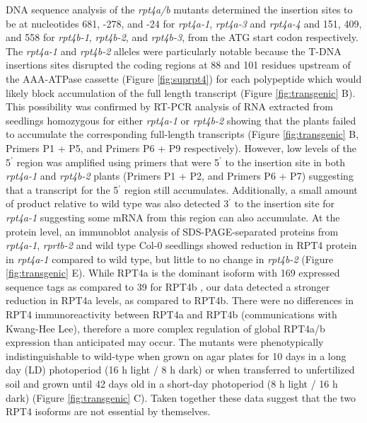 DNA sequence analysis of the \textit{rpt4a/b} mutants determined the insertion sites to be at nucleotides 681, -278, and -24 for \textit{rpt4a-1}, \textit{rpt4a-3} and \textit{rpt4a-4} and 151, 409, and 558 for \textit{rpt4b-1}, \textit{rpt4b-2}, and \textit{rpt4b-3}, from the ATG start codon respectively. The \textit{rpt4a-1} and \textit{rpt4b-2} alleles were particularly notable because the T-DNA insertions sites disrupted the coding regions at 88 and 101 residues upstream of the AAA-ATPase cassette (Figure \ref{fig:suprpt4}) for each polypeptide which would likely block accumulation of the full length transcript (Figure \ref{fig:transgenic} B). This possibility was confirmed by RT-PCR analysis of RNA extracted from seedlings homozygous for either \textit{rpt4a-1} or \textit{rpt4b-2} showing that the plants failed to accumulate the corresponding full-length transcripts (Figure \ref{fig:transgenic} B, Primers P1 + P5, and Primers P6 + P9 respectively). However, low levels of the 5$^{\prime}$ region was amplified using primers that were 5$^{\prime}$ to the insertion site in both \textit{rpt4a-1} and \textit{rpt4b-2} plants (Primers P1 + P2, and Primers P6 + P7) suggesting that  a transcript for the 5$^{\prime}$ region still accumulates. Additionally, a small amount of product relative to wild type was also detected 3$^{\prime}$ to the insertion site for \textit{rpt4a-1} suggesting some mRNA from this region can also accumulate. At the protein level, an immunoblot analysis of SDS-PAGE-separated proteins from \textit{rpt4a-1}, \textit{rprtb-2} and wild type Col-0 seedlings showed reduction in RPT4 protein in \textit{rpt4a-1} compared to wild type, but little to no change in \textit{rpt4b-2} (Figure \ref{fig:transgenic} E). While RPT4a is the dominant isoform with 169 expressed sequence tags as compared to 39 for RPT4b \citep{berardini15}, our data detected a stronger reduction in RPT4a levels, as compared to RPT4b. There were no differences in RPT4 immunoreactivity between RPT4a and RPT4b (communications with Kwang-Hee Lee), therefore a more complex regulation of global RPT4a/b expression than anticipated may occur.  The mutants were phenotypically indistinguishable to wild-type when grown on agar plates for 10 days in a long day (LD) photoperiod (16 h light / 8 h dark) or when transferred to unfertilized soil and grown until 42 days old in a short-day photoperiod (8 h light / 16 h dark) (Figure \ref{fig:transgenic} C).  Taken together these data suggest that the two RPT4 isoforms are not essential by themselves.

